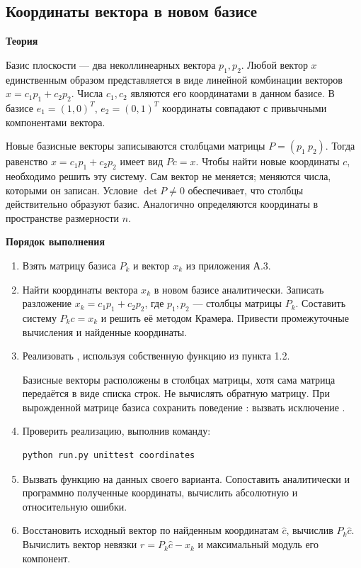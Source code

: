 \documentclass[12pt,a4paper]{article}
\newcommand{\micro}[1]{\subsection{#1}}
\newcommand{\taskhead}[1]{\par\textbf{#1}\par}
\begin{document}
\micro{Координаты вектора в новом базисе}
\taskhead{Теория}
Базис плоскости --- два неколлинеарных вектора $p_1,p_2$.
Любой вектор $x$ единственным образом представляется в виде линейной комбинации векторов
$x=c_1p_1+c_2p_2$. Числа $c_1,c_2$ являются его координатами
в данном базисе. В базисе $e_1=(1,0)^T$, $e_2=(0,1)^T$
координаты совпадают с привычными компонентами вектора.

Новые базисные векторы записываются столбцами матрицы $P=(p_1\ p_2)$.
Тогда равенство $x=c_1p_1+c_2p_2$ имеет вид $Pc=x$.
Чтобы найти новые координаты $c$, необходимо решить эту систему. Сам вектор не меняется;
меняются числа, которыми он записан. Условие $\det P\ne0$ обеспечивает,
что столбцы действительно образуют базис. Аналогично определяются
координаты в пространстве размерности $n$.

\taskhead{Порядок выполнения}
\begin{enumerate}
  \item Взять матрицу базиса $P_k$ и вектор $x_k$
  из приложения А.3.
  \item Найти координаты вектора $x_k$ в новом базисе
  аналитически. Записать разложение
  $x_k=c_1p_1+c_2p_2$, где $p_1,p_2$ ---
  столбцы матрицы $P_k$.
  Составить систему $P_kc=x_k$ и решить её методом Крамера.
  Привести промежуточные вычисления и найденные координаты.
  \item Реализовать ,
  используя собственную функцию 
  из пункта 1.2.

  Базисные векторы расположены в столбцах матрицы,
  хотя сама матрица передаётся в виде списка строк.
  Не вычислять обратную матрицу.
  При вырожденной матрице базиса сохранить поведение
  : вызвать исключение .
  \item Проверить реализацию, выполнив команду:
  \begin{lstlisting}[style=commands]
  python run.py unittest coordinates\end{lstlisting}
  \item Вызвать функцию на данных своего варианта.
  Сопоставить аналитически и программно полученные
  координаты, вычислить абсолютную и относительную ошибки.
  \item Восстановить исходный вектор по найденным
  координатам $\widehat{c}$, вычислив $P_k\widehat{c}$.
  Вычислить вектор невязки $r=P_k\widehat{c}-x_k$
  и максимальный модуль его компонент.
\end{enumerate}
\end{document}
